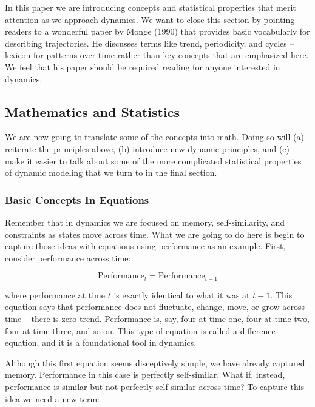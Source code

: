 \documentclass[english,,man]{apa6}
\theoremstyle{definition}
\theoremstyle{definition}
\theoremstyle{definition}
\theoremstyle{remark}
\begin{document}
In this paper we are introducing concepts and statistical properties
that merit attention as we approach dynamics. We want to close this
section by pointing readers to a wonderful paper by Monge (1990) that
provides basic vocabularly for describing trajectories. He discusses
terms like trend, periodicity, and cycles -- lexicon for patterns over
time rather than key concepts that are emphasized here. We feel that his
paper should be required reading for anyone interested in dynamics.

\hypertarget{mathematics-and-statistics}{%
\subsection{Mathematics and
Statistics}\label{mathematics-and-statistics}}

We are now going to translate some of the concepts into math. Doing so
will (a) reiterate the principles above, (b) introduce new dynamic
principles, and (c) make it easier to talk about some of the more
complicated statistical properties of dynamic modeling that we turn to
in the final section.

\hypertarget{basic-concepts-in-equations}{%
\subsubsection{Basic Concepts In
Equations}\label{basic-concepts-in-equations}}

Remember that in dynamics we are focused on memory, self-similarity, and
constraints as states move across time. What we are going to do here is
begin to capture those ideas with equations using performance as an
example. First, consider performance across time:

\begin{equation}
\textrm{Performance}_{t} = \textrm{Performance}_{t-1}
\end{equation}

\noindent where performance at time \(t\) is exactly identical to what
it was at \(t-1\). This equation says that performance does not
fluctuate, change, move, or grow across time -- there is zero trend.
Performance is, say, four at time one, four at time two, four at time
three, and so on. This type of equation is called a difference equation,
and it is a foundational tool in dynamics.

Although this first equation seems disceptively simple, we have already
captured memory. Performance in this case is perfectly self-similar.
What if, instead, performance is similar but not perfectly self-similar
across time? To capture this idea we need a new term:
\end{document}
